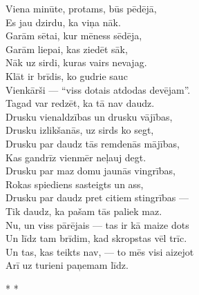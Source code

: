 \documentclass[14pt]{extarticle}
\begin{document}
Viena minūte, protams, būs pēdējā,\\
Es jau dzirdu, ka viņa nāk.\\
Garām sētai, kur mēness sēdēja,\\
Garām liepai, kas ziedēt sāk,\\
Nāk uz sirdi, kuras vairs nevajag.\\
Klāt ir brīdis, ko gudrie sauc\\
Vienkārši --- ``viss dotais atdodas devējam''.\\
Tagad var redzēt, ka tā nav daudz.\\
Drusku vienaldzības un drusku vājības,\\
Drusku izlikšanās, uz sirds ko segt,\\
Drusku par daudz tās remdenās mājības,\\
Kas gandrīz vienmēr neļauj degt.\\
Drusku par maz domu jaunās vingrības,\\
Rokas spiediens sasteigts un ass,\\
Drusku par daudz pret citiem stingrības ---\\
Tik daudz, ka pašam tās paliek maz.\\
Nu, un viss pārējais --- tas ir kā maize dots\\
Un līdz tam brīdim, kad skropstas vēl trīc.\\
Un tas, kas teikts nav, --- to mēs visi aizejot\\
Arī uz turieni paņemam līdz.


\newpage

{\large \sc * * *}
\end{document}
